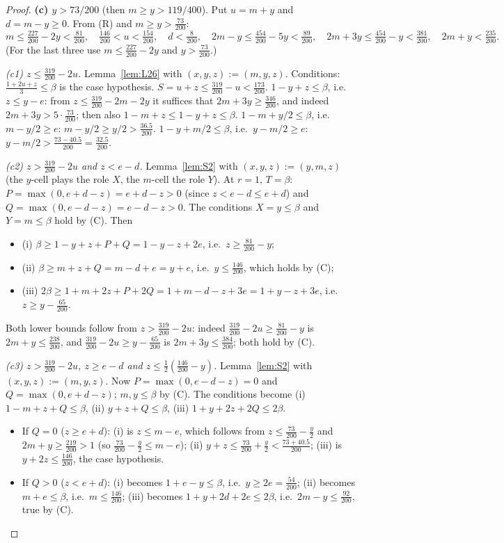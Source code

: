 \documentclass[11pt]{amsart}
\theoremstyle{definition}
\theoremstyle{remark}
\begin{document}
\begin{proof}
\medskip\noindent\textbf{(c) $y>73/200$} (then $m\ge y>119/400$). Put $u=m+y$ and $d=m-y\ge0$. From (R) and $m\ge y>\tfrac{73}{200}$:
\[
m\le\tfrac{227}{200}-2y<\tfrac{81}{200},\quad \tfrac{146}{200}<u<\tfrac{154}{200},\quad d<\tfrac{8}{200},\quad
2m-y\le\tfrac{454}{200}-5y<\tfrac{89}{200},\quad 2m+3y\le\tfrac{454}{200}-y<\tfrac{381}{200},\quad 2m+y<\tfrac{235}{200}. \tag{C}
\]
(For the last three use $m\le\tfrac{227}{200}-2y$ and $y>\tfrac{73}{200}$.)

\emph{(c1) $z\le\tfrac{319}{200}-2u$.} Lemma~\ref{lem:L26} with $(x,y,z):=(m,y,z)$. Conditions: $\tfrac{1+2u+z}{3}\le\beta$ is the case hypothesis. $S=u+z\le\tfrac{319}{200}-u<\tfrac{173}{200}$. $1-y+z\le\beta$, i.e.\ $z\le y-e$: from $z\le\tfrac{319}{200}-2m-2y$ it suffices that $2m+3y\ge\tfrac{346}{200}$, and indeed $2m+3y>5\cdot\tfrac{73}{200}$; then also $1-m+z\le1-y+z\le\beta$. $1-m+y/2\le\beta$, i.e.\ $m-y/2\ge e$: $m-y/2\ge y/2>\tfrac{36.5}{200}$. $1-y+m/2\le\beta$, i.e.\ $y-m/2\ge e$: $y-m/2>\tfrac{73-40.5}{200}=\tfrac{32.5}{200}$.

\emph{(c2) $z>\tfrac{319}{200}-2u$ and $z<e-d$.} Lemma~\ref{lem:S2} with $(x,y,z):=(y,m,z)$ (the $y$-cell plays the role $X$, the $m$-cell the role $Y$). At $r=1$, $T=\beta$: $P=\max(0,e+d-z)=e+d-z>0$ (since $z<e-d\le e+d$) and $Q=\max(0,e-d-z)=e-d-z>0$. The conditions $X=y\le\beta$ and $Y=m\le\beta$ hold by (C). Then
\begin{itemize}
\item (i) $\beta\ge1-y+z+P+Q=1-y-z+2e$, i.e.\ $z\ge\tfrac{81}{200}-y$;
\item (ii) $\beta\ge m+z+Q=m-d+e=y+e$, i.e.\ $y\le\tfrac{146}{200}$, which holds by (C);
\item (iii) $2\beta\ge1+m+2z+P+2Q=1+m-d-z+3e=1+y-z+3e$, i.e.\ $z\ge y-\tfrac{65}{200}$.
\end{itemize}
Both lower bounds follow from $z>\tfrac{319}{200}-2u$: indeed $\tfrac{319}{200}-2u\ge\tfrac{81}{200}-y$ is $2m+y\le\tfrac{238}{200}$, and $\tfrac{319}{200}-2u\ge y-\tfrac{65}{200}$ is $2m+3y\le\tfrac{384}{200}$; both hold by (C).

\emph{(c3) $z>\tfrac{319}{200}-2u$, $z\ge e-d$ and $z\le\tfrac12(\tfrac{146}{200}-y)$.} Lemma~\ref{lem:S2} with $(x,y,z):=(m,y,z)$. Now $P=\max(0,e-d-z)=0$ and $Q=\max(0,e+d-z)$; $m,y\le\beta$ by (C). The conditions become (i) $1-m+z+Q\le\beta$, (ii) $y+z+Q\le\beta$, (iii) $1+y+2z+2Q\le2\beta$.
\begin{itemize}
\item If $Q=0$ ($z\ge e+d$): (i) is $z\le m-e$, which follows from $z\le\tfrac{73}{200}-\tfrac y2$ and $2m+y\ge\tfrac{219}{200}>1$ (so $\tfrac{73}{200}-\tfrac y2\le m-e$); (ii) $y+z\le\tfrac{73}{200}+\tfrac y2<\tfrac{73+40.5}{200}$; (iii) is $y+2z\le\tfrac{146}{200}$, the case hypothesis.
\item If $Q>0$ ($z<e+d$): (i) becomes $1+e-y\le\beta$, i.e.\ $y\ge2e=\tfrac{54}{200}$; (ii) becomes $m+e\le\beta$, i.e.\ $m\le\tfrac{146}{200}$; (iii) becomes $1+y+2d+2e\le2\beta$, i.e.\ $2m-y\le\tfrac{92}{200}$, true by (C).
\end{itemize}


\end{proof}
\end{document}
